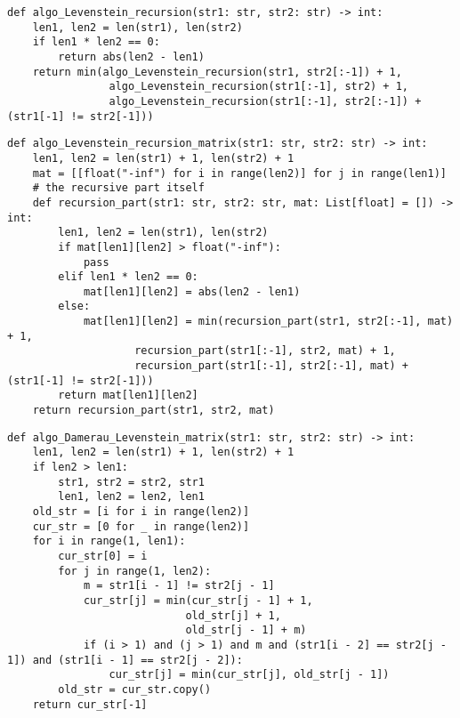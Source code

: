 \vspace{0.25cm}
\begin{lstlisting}[caption=реализация рекурсивного алгоритма Левенштейна, label=lst:levenshtein_recursive]
def algo_Levenstein_recursion(str1: str, str2: str) -> int:
    len1, len2 = len(str1), len(str2)
    if len1 * len2 == 0:
        return abs(len2 - len1)
    return min(algo_Levenstein_recursion(str1, str2[:-1]) + 1,
                algo_Levenstein_recursion(str1[:-1], str2) + 1,
                algo_Levenstein_recursion(str1[:-1], str2[:-1]) + (str1[-1] != str2[-1]))
\end{lstlisting}

\vspace{0.25cm}
\begin{lstlisting}[caption=реализация рекурсивно-матричного алгоритма Левенштейна, label=lst:levenshtein_recursive_matrix]
def algo_Levenstein_recursion_matrix(str1: str, str2: str) -> int:
    len1, len2 = len(str1) + 1, len(str2) + 1
    mat = [[float("-inf") for i in range(len2)] for j in range(len1)]
    # the recursive part itself
    def recursion_part(str1: str, str2: str, mat: List[float] = []) -> int:
        len1, len2 = len(str1), len(str2)
        if mat[len1][len2] > float("-inf"):
            pass
        elif len1 * len2 == 0:
            mat[len1][len2] = abs(len2 - len1)
        else:
            mat[len1][len2] = min(recursion_part(str1, str2[:-1], mat) + 1,
                    recursion_part(str1[:-1], str2, mat) + 1,
                    recursion_part(str1[:-1], str2[:-1], mat) + (str1[-1] != str2[-1]))
        return mat[len1][len2]
    return recursion_part(str1, str2, mat)
\end{lstlisting}

\vspace{0.25cm}
\begin{lstlisting}[caption=реализация матричного алгоритма Дамерау-Левенштейна, label=lst:damerau_levenshtein_matrix]
def algo_Damerau_Levenstein_matrix(str1: str, str2: str) -> int:
    len1, len2 = len(str1) + 1, len(str2) + 1
    if len2 > len1:
        str1, str2 = str2, str1
        len1, len2 = len2, len1
    old_str = [i for i in range(len2)]
    cur_str = [0 for _ in range(len2)]
    for i in range(1, len1):
        cur_str[0] = i
        for j in range(1, len2):
            m = str1[i - 1] != str2[j - 1]
            cur_str[j] = min(cur_str[j - 1] + 1,
                            old_str[j] + 1,
                            old_str[j - 1] + m)
            if (i > 1) and (j > 1) and m and (str1[i - 2] == str2[j - 1]) and (str1[i - 1] == str2[j - 2]):
                cur_str[j] = min(cur_str[j], old_str[j - 1])
        old_str = cur_str.copy()
    return cur_str[-1]
\end{lstlisting}

